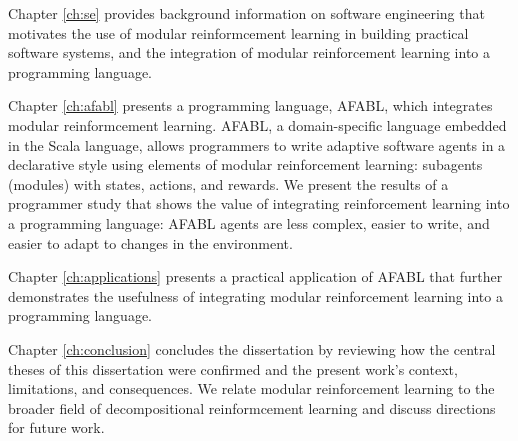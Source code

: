 Chapter \ref{ch:se} provides background information on software engineering that motivates the use of modular reinformcement learning in building practical software systems, and the integration of modular reinforcement learning into a programming language.

Chapter \ref{ch:afabl} presents a programming language, AFABL, which integrates modular reinformcement learning. AFABL, a domain-specific language embedded in the Scala language, allows programmers to write adaptive software agents in a declarative style using elements of modular reinforcement learning: subagents (modules) with states, actions, and rewards. We present the results of a programmer study that shows the value of integrating reinforcement learning into a programming language: AFABL agents are less complex, easier to write, and easier to adapt to changes in the environment.

Chapter \ref{ch:applications} presents a practical application of AFABL that further demonstrates the usefulness of integrating modular reinforcement learning into a programming language.

Chapter \ref{ch:conclusion} concludes the dissertation by reviewing how the central theses of this dissertation were confirmed and the present work's context, limitations, and consequences. We relate modular reinforcement learning to the broader field of decompositional reinformcement learning and discuss directions for future work.
